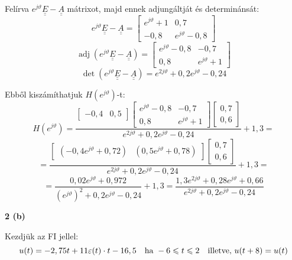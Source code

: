 \documentclass[12pt,a4paper]{article}
\newcommand\uuline[1]{\underline{\underline{#1}}}
\DeclareMathOperator{\adj}{adj}
\begin{document}
Felírva $e^{j\vartheta} \uuline{E}-\uuline{A}$ mátrixot, majd ennek adjungáltját és determinánsát:
\[e^{j\vartheta} \uuline{E}-\uuline{A} = \left[\begin{matrix}e^{j\vartheta}+1 & 0,7\\-0,8 & e^{j\vartheta}-0,8\end{matrix}\right]\]
\[\adj(e^{j\vartheta} \uuline{E}-\uuline{A}) = \left[\begin{matrix}e^{j\vartheta}-0,8 & -0,7\\0,8 & e^{j\vartheta}+1\end{matrix}\right]\]
\[\det(e^{j\vartheta} \uuline{E}-\uuline{A}) = e^{2j\vartheta}+ 0,2e^{j\vartheta} -0,24\]

Ebből kiszámíthatjuk $H(e^{j \vartheta})$-t:
\[H(e^{j \vartheta}) = \frac{\left[\begin{matrix}-0,4 & 0,5\end{matrix}\right] \left[\begin{matrix}e^{j\vartheta}-0,8 & -0,7\\0,8 & e^{j\vartheta}+1\end{matrix}\right] \left[\begin{matrix}0,7\\0,6\end{matrix}\right]}{e^{2j\vartheta}+ 0,2e^{j\vartheta} -0,24} + 1,3 = \]
\[= \frac{\left[\begin{matrix}(-0,4e^{j\vartheta}+0,72) & (0,5e^{j\vartheta}+0,78)\end{matrix}\right] \left[\begin{matrix}0,7\\0,6\end{matrix}\right]}{e^{2j\vartheta}+ 0,2e^{j\vartheta} -0,24} + 1,3 = \]
\[= \frac{0,02e^{j\vartheta}+0,972}{(e^{j\vartheta})^2+ 0,2e^{j\vartheta} -0,24} + 1,3 = \boxed{\frac{1,3e^{2j\vartheta}+0,28e^{j\vartheta}+0,66}{e^{2j\vartheta}+ 0,2e^{j\vartheta}-0,24}}\]

\textbf{2 (b)}

Kezdjük az FI jellel:
\[u(t) = -2,75t + 11\varepsilon(t)\cdot t -16,5 \quad \hbox{ha } -6\leqslant t \leqslant 2 \quad \hbox{illetve, } u(t+8) = u(t)\]
\end{document}
